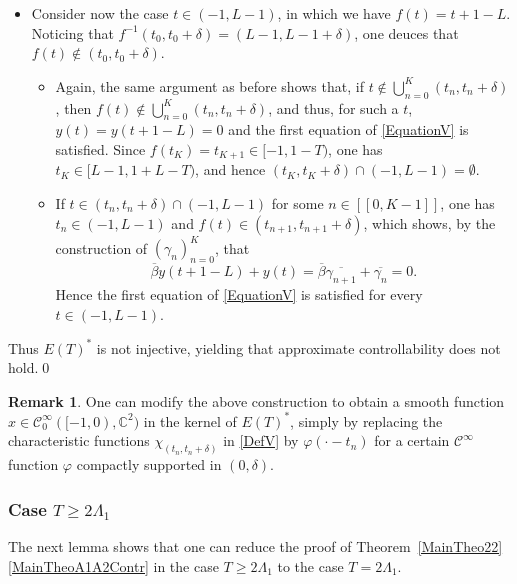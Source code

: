 \documentclass[10pt]{article}
\newcommand{\llbracket}{[\![}
\newcommand{\rrbracket}{]\!]}
\theoremstyle{plain}
\theoremstyle{definition}
\newtheorem{remk}[theo]{Remark}
\numberwithin{equation}{section}\numberwithin{figure}{section}\emergencystretch=3em
\begin{document}
\begin{itemize}
\item
Consider now the case $t \in (-1, L - 1)$, in which we have $f(t) = t + 1 - L$.
Noticing that $f^{-1}(t_0, t_0 + \delta) = (L-1, L-1+\delta)$, one deuces that \hbox{$f(t) \notin (t_0, t_0 + \delta)$}.
\begin{itemize}
\item
Again, the same argument as before shows that, if $t \notin \bigcup_{n=0}^K (t_n, t_n + \delta)$, then \hbox{$f(t) \notin \bigcup_{n=0}^K (t_n, t_n + \delta)$}, and thus, for such a $t$, $y(t) = y(t + 1 - L) = 0$ and the first equation of \eqref{EquationV} is satisfied. Since $f(t_K) = t_{K + 1} \in [-1, 1 - T)$, one has $t_K \in [L - 1, 1 + L - T)$, and hence $(t_K, t_K + \delta) \cap (-1, L-1) = \emptyset$.
\item
If $t \in (t_n, t_n + \delta) \cap (-1, L-1)$ for some $n \in \llbracket 0, K-1\rrbracket$, one has $t_n \in (-1, L-1)$ and $f(t) \in (t_{n+1}, t_{n+1} + \delta)$, which shows, by the construction of $(\gamma_n)_{n=0}^K$, that
\[
\overline\beta y(t + 1 - L) + y(t) = \overline\beta \overline{\gamma_{n+1}} + \overline{\gamma_{n}} = 0.
\]
Hence the first equation of \eqref{EquationV} is satisfied for every $t \in (-1, L - 1)$.
\end{itemize}
\end{itemize}

Thus $E(T)^\ast$ is not injective, yielding that approximate controllability does not hold.\qed

\begin{remk}
One can modify the above construction to obtain a smooth function $x \in \mathcal C^\infty_0([-1, 0), \mathbb C^2)$ in the kernel of $E(T)^\ast$, simply by replacing the characteristic functions $\chi_{(t_n, t_n + \delta)}$ in \eqref{DefV} by $\varphi(\cdot - t_n)$ for a certain $\mathcal C^\infty$ function $\varphi$ compactly supported in $(0, \delta)$.
\end{remk}

\subsubsection{\texorpdfstring{Case $T \geq 2 \Lambda_1$}{Case T >= 2 Lambda1}}

The next lemma shows that one can reduce the proof of Theorem~\ref{MainTheo22}\eqref{MainTheoA1A2Contr} in the case $T \geq 2 \Lambda_1$ to the case $T = 2 \Lambda_1$.
\end{document}
